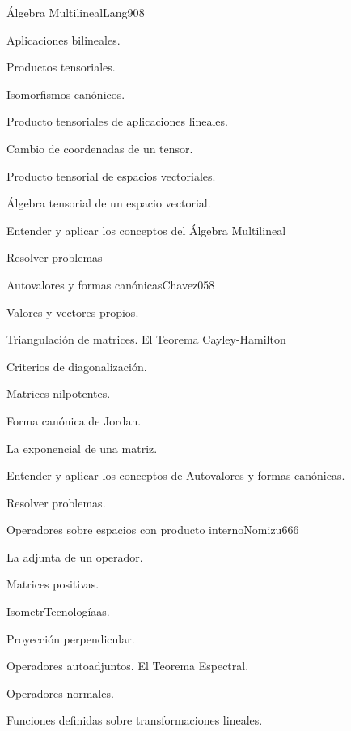 \begin{syllabus}
\begin{unit}{Álgebra Multilineal}{Lang90}{8}
   \begin{topics}
         \item  Aplicaciones bilineales.
	 \item  Productos tensoriales.
         \item  Isomorfismos canónicos.
	 \item  Producto tensoriales de aplicaciones lineales.
         \item  Cambio de coordenadas de un tensor.
	 \item  Producto tensorial de espacios vectoriales.
         \item  Álgebra tensorial de un espacio vectorial.
   \end{topics}

   \begin{unitgoals}
         \item  Entender y aplicar los conceptos del Álgebra Multilineal
         \item  Resolver problemas
   \end{unitgoals}
\end{unit}

\begin{unit}{Autovalores y formas canónicas}{Chavez05}{8}
   \begin{topics}
	\item  Valores y vectores propios.
	\item  Triangulación de matrices. El Teorema Cayley-Hamilton
	\item  Criterios de diagonalización.
	\item  Matrices nilpotentes.
	\item Forma canónica de Jordan.
	\item La exponencial de una matriz.
   \end{topics}

   \begin{unitgoals}
         \item  Entender y aplicar los conceptos de Autovalores y formas canónicas.
         \item  Resolver problemas.
   \end{unitgoals}
\end{unit}

\begin{unit}{Operadores sobre espacios con producto interno}{Nomizu66}{6}
   \begin{topics}
	\item  La adjunta de un operador.
	\item  Matrices positivas.
	\item  IsometrTecnologíaas.
	\item  Proyección perpendicular.
	\item  Operadores autoadjuntos. El Teorema Espectral.
	\item  Operadores normales.
	\item Funciones definidas sobre transformaciones lineales.
   \end{topics}


\end{unit}
\end{syllabus}
